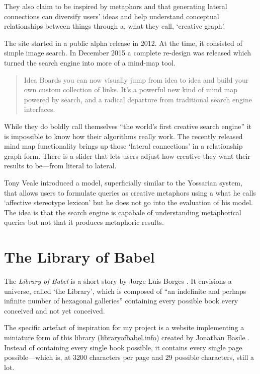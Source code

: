 They also claim to be inspired by metaphors and that generating lateral connections can diversify users' ideas and help understand conceptual relationships between things through a, what they call, `creative graph'.

The site started in a public alpha release in 2012. At the time, it consisted of simple image search. In December 2015 a complete re-design was released \autocite{YossarianEmail} which turned the search engine into more of a mind-map tool.

\begin{quotation}
  Idea Boards you can now visually jump from idea to idea and build your own custom collection of links. It's a powerful new kind of mind map powered by search, and a radical departure from traditional search engine interfaces. 
\end{quotation}

While they do boldly call themselves ``the world's first creative search engine'' \autocite{Yossarian2015} it is impossible to know how their algorithms really work. The recently released mind map functionality brings up those `lateral connections' in a relationship graph form. There is a slider that lets users adjust how creative they want their results to be---from literal to lateral.

Tony Veale introduced a model, superficially similar to the Yossarian system, that allows users to formulate queries as creative metaphors using a what he calls `affective stereotype lexicon' \autocite*{Veale2013} but he does not go into the evaluation of his model. The idea is that the search engine is capabale of understanding metaphorical queries but not that it produces metaphoric results.


\section{The Library of Babel}
\label{s:babel}

The \textit{Library of Babel} is a short story by Jorge Luis Borges \autocite*{Borges1964}. It envisions a universe, called `the Library', which is composed of ``an indefinite and perhaps infinite number of hexagonal galleries'' containing every possible book every conceived and not yet conceived.

The specific artefact of inspiration for my project is a website implementing a miniature form of this library (\url{libraryofbabel.info}) created by Jonathan Basile \autocite*{Basile2015}. Instead of containing every single book possible, it contains every single page possible---which is, at \num{3200} characters per page and \num{29} possible characters, still a lot.

